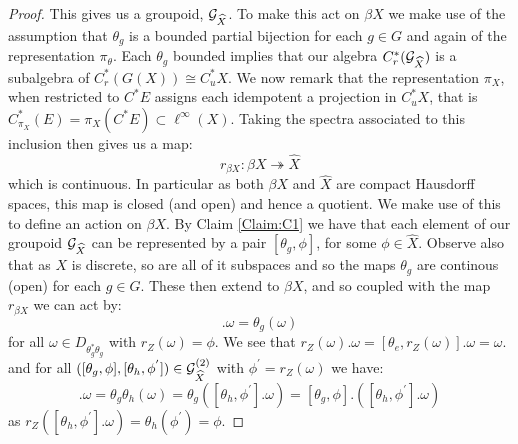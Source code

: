 \begin{proof}
This gives us a groupoid, $\mathcal{G}_{\widehat{X}}$. To make this act on $\beta X$ we make use of the assumption that $\theta_{g}$ is a bounded partial bijection for each $g \in G$ and again of the representation $\pi_{\theta}$. Each $\theta_{g}$ bounded implies that our algebra $C^{*}_{r}(\mathcal{G}_{\widehat{X}})$ is a subalgebra of $C^{*}_{r}(G(X)) \cong C^{*}_{u}X$. We now remark that the representation $\pi_{X}$, when restricted to $C^{*}E$ assigns each idempotent a projection in $C^{*}_{u}X$, that is $C^{*}_{\pi_{X}}(E)=\pi_{X}(C^{*}E) \subset \ell^{\infty}(X)$. Taking the spectra associated to this inclusion then gives us a map:
\begin{equation*}
r_{\beta X}: \beta X \twoheadrightarrow \widehat{X}
\end{equation*}
which is continuous. In particular as both $\beta X$ and $\widehat{X}$ are compact Hausdorff spaces, this map is closed (and open) and hence a quotient. We make use of this to define an action on $\beta X$. By Claim \ref{Claim:C1} we have that each element of our groupoid $\mathcal{G}_{\widehat{X}}$ can be represented by a pair $[\theta_{g}, \phi]$, for some $\phi \in \widehat{X}$. Observe also that as $X$ is discrete, so are all of it subspaces and so the maps $\theta_{g}$ are continous (open) for each $g \in G$. These then extend to $\beta X$, and so coupled with the map $r_{\beta X}$ we can act by:
\begin{equation*}
[\theta_{g},\phi].\omega = \theta_{g}(\omega)
\end{equation*}
for all $\omega \in D_{\theta_{g}^{*}\theta_{g}}$ with $r_{Z}(\omega) = \phi$. We see that $r_{Z}(\omega).\omega= [\theta_{e}, r_{Z}(\omega)].\omega = \omega.$ and for all $([\theta_{g},\phi],[\theta_{h},\phi^{'}]) \in \mathcal{G}_{\widehat{X}}^{(2)}$ with $\phi^{'}=r_{Z}(\omega)$ we have:
\begin{equation*}
[\theta_{g}\theta_{h},\phi^{'}].\omega = \theta_{g}\theta_{h}(\omega) = \theta_{g}([\theta_{h},\phi^{'}].\omega)=[\theta_{g},\phi].([\theta_{h},\phi^{'}].\omega)
\end{equation*}
as $r_{Z}([\theta_{h},\phi^{'}].\omega)=\theta_{h}(\phi^{'})=\phi$.


\end{proof}

